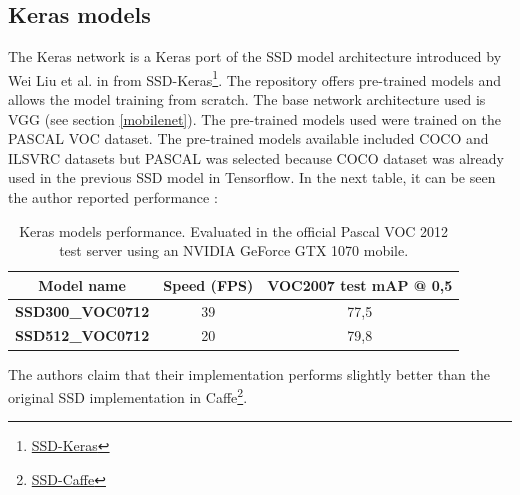 \subsection{Keras models} \label{keras_models}
The Keras network is a Keras port of the SSD model architecture introduced by Wei Liu et al. in \cite{liu2016ssd} from SSD-Keras\footnote{\href{https://github.com/pierluigiferrari/ssd_keras}{SSD-Keras}}. The repository offers pre-trained models and allows the model training from scratch. The base network architecture used is VGG (see section \ref{mobilenet}). The pre-trained models used were trained on the PASCAL VOC dataset. The pre-trained models available included COCO and ILSVRC datasets but PASCAL was selected because COCO dataset was already used in the previous SSD model in Tensorflow. In the next table, it can be seen the author reported performance \cite{ssdkerasperf}:
\begin{table}[H]
\begin{center}
\begin{tabular}{|c|c|c|}
\hline
Model name               & Speed (FPS) & VOC2007 test mAP @ 0,5 \\ \hline
\textbf{SSD300\_VOC0712} & 39          & 77,5                   \\ \hline
\textbf{SSD512\_VOC0712} & 20          & 79,8                   \\ \hline
\end{tabular}
\end{center}
\caption{Keras models performance. Evaluated in the official Pascal VOC 2012 test server using an NVIDIA GeForce GTX 1070 mobile.}
\end{table}
The authors claim that their implementation performs slightly better than the original SSD implementation in Caffe\footnote{\href{https://github.com/weiliu89/caffe/tree/ssd}{SSD-Caffe}}.

